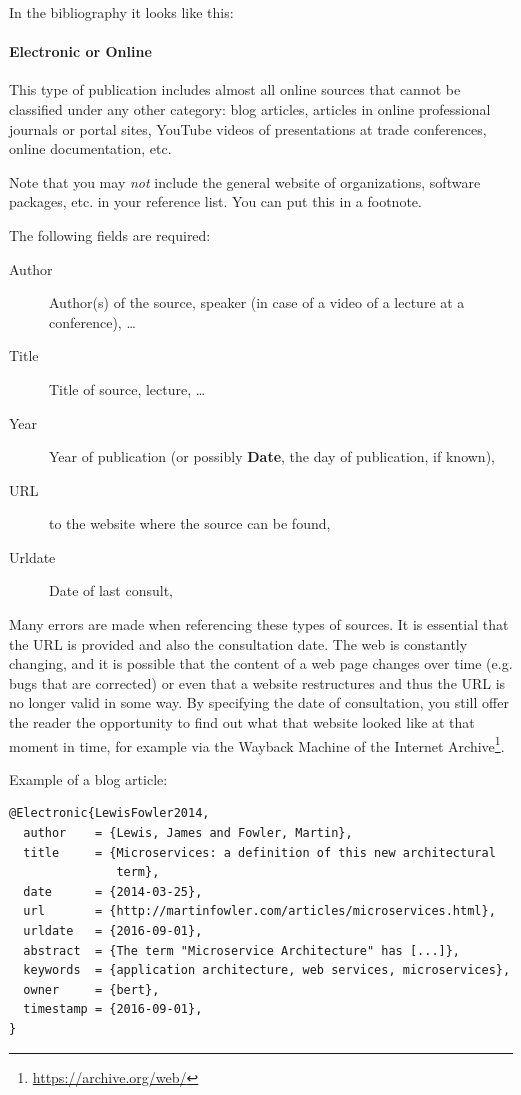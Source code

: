 In the bibliography it looks like this: 


\paragraph{Electronic or Online}

This type of publication includes almost all online sources that cannot be classified under any other category: blog articles, articles in online professional journals or portal sites, YouTube videos of presentations at trade conferences, online documentation, etc.

Note that you may \emph{not} include the general website of organizations, software packages, etc. in your reference list. You can put this in a footnote.

The following fields are required:

\begin{description}
    \item[Author] Author(s) of the source, speaker (in case of a video of a lecture at a conference), \ldots
    \item[Title] Title of source, lecture, \ldots
    \item[Year] Year of publication (or possibly \textbf{Date}, the day of publication, if known),
    \item[URL] to the website where the source can be found,
    \item[Urldate] Date of last consult,
\end{description}

Many errors are made when referencing these types of sources. It is essential that the URL is provided and also the consultation date. The web is constantly changing, and it is possible that the content of a web page changes over time (e.g. bugs that are corrected) or even that a website restructures and thus the URL is no longer valid in some way. By specifying the date of consultation, you still offer the reader the opportunity to find out what that website looked like at that moment in time, for example via the Wayback Machine of the Internet Archive\footnote{\url{https://archive.org/web/}}.

Example of a blog article:

\begin{verbatim}
@Electronic{LewisFowler2014,
  author    = {Lewis, James and Fowler, Martin},
  title     = {Microservices: a definition of this new architectural
               term},
  date      = {2014-03-25},
  url       = {http://martinfowler.com/articles/microservices.html},
  urldate   = {2016-09-01},
  abstract  = {The term "Microservice Architecture" has [...]},
  keywords  = {application architecture, web services, microservices},
  owner     = {bert},
  timestamp = {2016-09-01},
}
\end{verbatim}

